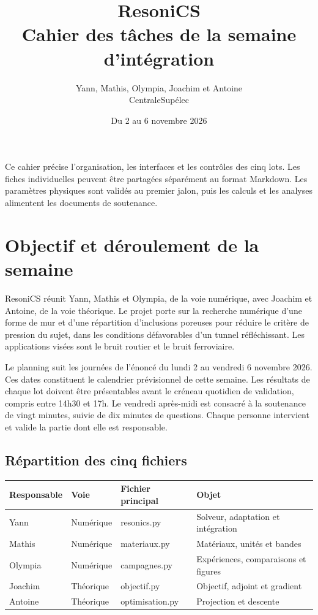\documentclass[11pt,a4paper]{article}
\title{ResoniCS\\Cahier des tâches de la semaine d'intégration}
\author{Yann, Mathis, Olympia, Joachim et Antoine\\CentraleSupélec}
\date{Du 2 au 6 novembre 2026}
\begin{document}
\maketitle
Ce cahier précise l'organisation, les interfaces et les contrôles des cinq lots. Les fiches individuelles peuvent être partagées séparément au format Markdown. Les paramètres physiques sont validés au premier jalon, puis les calculs et les analyses alimentent les documents de soutenance.
\tableofcontents

\section{Objectif et déroulement de la semaine}

ResoniCS réunit Yann, Mathis et Olympia, de la voie numérique, avec Joachim et Antoine, de la voie théorique. Le projet porte sur la recherche numérique d'une forme de mur et d'une répartition d'inclusions poreuses pour réduire le critère de pression du sujet, dans les conditions défavorables d'un tunnel réfléchissant. Les applications visées sont le bruit routier et le bruit ferroviaire.

Le planning suit les journées de l'énoncé du lundi 2 au vendredi 6 novembre 2026. Ces dates constituent le calendrier prévisionnel de cette semaine. Les résultats de chaque lot doivent être présentables avant le créneau quotidien de validation, compris entre 14h30 et 17h. Le vendredi après-midi est consacré à la soutenance de vingt minutes, suivie de dix minutes de questions. Chaque personne intervient et valide la partie dont elle est responsable.

\subsection{Répartition des cinq fichiers}

\begin{table}[H]\centering\small
\begin{tabularx}{\textwidth}{@{}>{\raggedright\arraybackslash}X>{\raggedright\arraybackslash}X>{\raggedright\arraybackslash}X>{\raggedright\arraybackslash}X@{}}
\toprule
Responsable & Voie & Fichier principal & Objet \\
\midrule
Yann & Numérique & {\small\ttfamily resonics.py} & Solveur, adaptation et intégration \\
Mathis & Numérique & {\small\ttfamily materiaux.py} & Matériaux, unités et bandes \\
Olympia & Numérique & {\small\ttfamily campagnes.py} & Expériences, comparaisons et figures \\
Joachim & Théorique & {\small\ttfamily objectif.py} & Objectif, adjoint et gradient \\
Antoine & Théorique & {\small\ttfamily optimisation.py} & Projection et descente \\
\bottomrule
\end{tabularx}\end{table}
\end{document}
